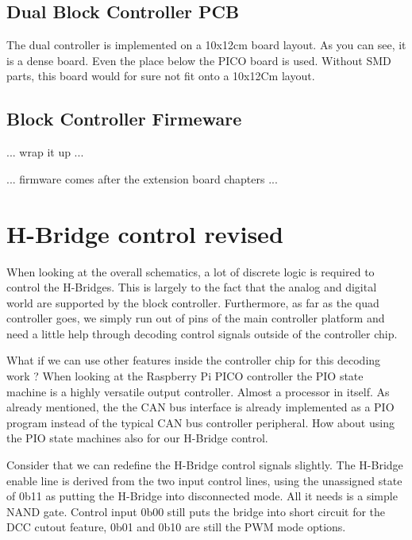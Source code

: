 \subsection{Dual Block Controller PCB}

The dual controller is implemented on a 10x12cm board layout. As you can see, it is a dense board. Even the place below the PICO board is used. Without SMD parts, this board would for sure not fit onto a 10x12Cm layout.


\subsection{Block Controller Firmeware}


... wrap it up ...

... firmware comes after the extension board chapters ...


\section{H-Bridge control revised}

When looking at the overall schematics, a lot of discrete logic is required to control the H-Bridges. This is largely to the fact that the analog and digital world are supported by the block controller. Furthermore, as far as the quad controller goes, we simply run out of pins of the main controller platform and need a little help through decoding control signals outside of the controller chip.

What if we can use other features inside the controller chip for this decoding work ? When looking at the Raspberry Pi PICO controller the PIO state machine is a highly versatile output controller. Almost a processor in itself. As already mentioned, the the CAN bus interface is already implemented as a PIO program instead of the typical CAN bus controller peripheral. How about using the PIO state machines also for our H-Bridge control. 

Consider that we can redefine the H-Bridge control signals slightly. The H-Bridge enable line is derived from the two  input control lines, using the unassigned state of 0b11 as putting the H-Bridge into disconnected mode. All it needs is a simple NAND gate. Control input 0b00 still puts the bridge into short circuit for the DCC cutout feature, 0b01 and 0b10 are still the PWM mode options. 

